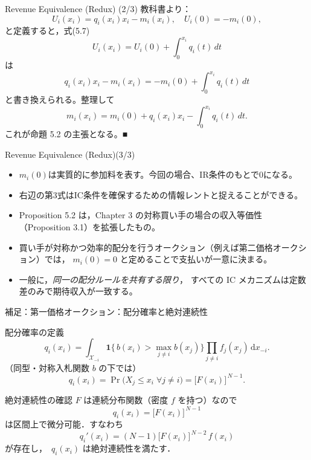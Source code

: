 \documentclass[dvipdfmx,autodetect-engine]{beamer}
\begin{document}
\begin{frame}{Revenue Equivalence (Redux) (2/3)}
  教科書より：
  \[
    U_i(x_i) = q_i(x_i)x_i - m_i(x_i),\quad
    U_i(0) = -m_i(0),
  \]
  と定義すると，式(5.7)
  \[
    U_i(x_i)=U_i(0)+\int_{0}^{x_i}q_i(t)\,dt
  \]
  は
  \[
    q_i(x_i)x_i - m_i(x_i)
    = -m_i(0) + \int_{0}^{x_i}q_i(t)\,dt
  \]
  と書き換えられる。整理して
  \[
    m_i(x_i)
    = m_i(0) + q_i(x_i)x_i - \int_{0}^{x_i}q_i(t)\,dt.
  \]
  これが命題 5.2 の主張となる。■
\end{frame}

\begin{frame}{Revenue Equivalence (Redux)(3/3)}
  \begin{itemize}
    \item $m_i(0)$は実質的に参加料を表す。今回の場合、IR条件のもとで0になる。
    \item 右辺の第3式はIC条件を確保するための情報レントと捉えることができる。
    \item Proposition 5.2 は，Chapter 3 の対称買い手の場合の収入等価性（Proposition 3.1）を拡張したもの。
    \item 買い手が対称かつ効率的配分を行うオークション（例えば第二価格オークション）では，
          $m_i(0)=0$ と定めることで支払いが一意に決まる。
    \item 一般に，\emph{同一の配分ルールを共有する限り}，
          すべての IC メカニズムは定数差のみで期待収入が一致する。
  \end{itemize}
\end{frame}

\begin{frame}{補足：第一価格オークション：配分確率と絶対連続性}
  \small
  \begin{block}{配分確率の定義}
    \[
      q_i(x_i)
      = \int_{\mathcal X_{-i}}
          \mathbf{1}\{\,b(x_i) > \max_{j\neq i} b(x_j)\}
          \prod_{j\neq i} f_j(x_j)\,\mathrm{d}x_{-i}.
    \]
    （同型・対称入札関数 \(b\) の下では）
    \[
      q_i(x_i)
      = \Pr\bigl(X_j \le x_i\;\forall j\neq i\bigr)
      = \bigl[F(x_i)\bigr]^{\,N-1}.
    \]
  \end{block}

  \vspace{1ex}
  \begin{block}{絶対連続性の確認}
    \(F\) は連続分布関数（密度 \(f\) を持つ）なので
    \[
      q_i(x_i)
      = \bigl[F(x_i)\bigr]^{\,N-1}
    \]
    は区間上で微分可能．すなわち
    \[
      q_i'(x_i)
      = (N-1)\bigl[F(x_i)\bigr]^{\,N-2}\,f(x_i)
    \]
    が存在し，
    \(\,q_i(x_i)\) は絶対連続性を満たす．
  \end{block}
\end{frame}
\end{document}
